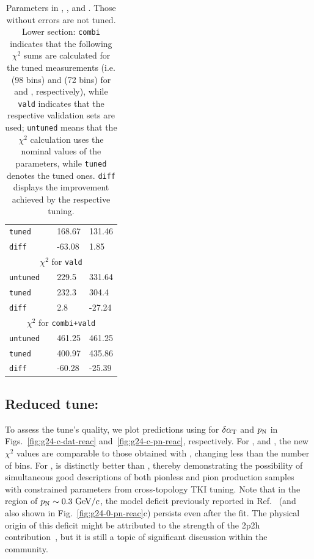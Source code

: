 \begin{table}[!htb]
\begin{tabular}{p{1.5cm}p{1.5cm}p{2.1cm}p{2.3cm}}
    \texttt{tuned}           & & 168.67         & 131.46        \\
    \texttt{diff}            & & -63.08         & 1.85         \\
    \hline
    \multicolumn{4}{c}{$\chi^2$ \textrm{for} \texttt{vald}} \\
    \hline
    \texttt{untuned}    & & 229.5          & 331.64        \\
    \texttt{tuned}            & & 232.3    & 304.4         \\
    \texttt{diff}       & & 2.8          & -27.24        \\
    \hline
    \multicolumn{4}{c}{$\chi^2$ \textrm{for} \texttt{combi+vald}} \\
    \hline
    \texttt{untuned}    & &  461.25          &  461.25        \\
    \texttt{tuned}          &  & 400.97 & 435.86        \\
    \texttt{diff} & & -60.28         & -25.39  \\     
    \hline
    \hline
\end{tabular}
\caption{\label{tab:restunes}
	Parameters in \gZero, \gC, and \gT. Those without errors are not tuned. Lower section: \texttt{combi} indicates that the following $\chi^2$ sums are calculated for the tuned measurements (i.e. \cbRedPar (98 bins) and \cbAllPar (72 bins) for \gC and \gT, respectively), while \texttt{vald} indicates that the respective validation sets are used; \texttt{untuned} means that the $\chi^2$ calculation uses the nominal values of the parameters, while \texttt{tuned} denotes the tuned ones. \texttt{diff} displays the improvement achieved by the respective tuning.  
}
\end{table}


\subsection{Reduced tune: \gC}

To assess the tune's quality, we plot predictions using \gC for $\delta\alpha_\textrm{T}$ and $p_\textrm{N}$ in Figs.~\ref{fig:g24-c-dat-reac} and~\ref{fig:g24-c-pn-reac},  respectively. For \ttkzpi, \ttkpip and \minzpi, the new $\chi^2$ values are comparable to those obtained with \gZero, changing less than the number of bins. For \minpiz, \gC is distinctly better than \gZero, thereby demonstrating the possibility of simultaneous good descriptions of both pionless and pion production samples with constrained parameters from cross-topology TKI tuning. Note that in the region of $p_\textrm{N}\sim0.3~\textrm{GeV}/c$, the model deficit previously reported in Ref.~\cite{MINERvA:2018hba} (and also shown in Fig.~\ref{fig:g24-0-pn-reac}c) persists even after the fit. The physical origin of this deficit might be attributed to the strength of the 2p2h contribution~\cite{MINERvA:2018hba}, but it is still a topic of significant discussion within the community.

